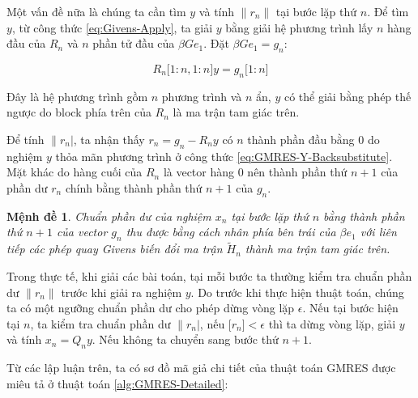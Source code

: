 \documentclass[14pt, a4paper]{article}
\numberwithin{equation}{section}
\numberwithin{algorithm}{section}
\numberwithin{figure}{section}
\newtheorem{md}{Mệnh đề}
\numberwithin{dl}{section}
\numberwithin{md}{section}
\numberwithin{bd}{section}
\numberwithin{dn}{section}
\begin{document}
Một vấn đề nữa là chúng ta cần tìm $y$ và tính $\lVert r_n \rVert$ tại bước lặp thứ $n$.
Để tìm $y$, từ công thức \ref{eq:Givens-Apply}, ta giải $y$ bằng giải hệ phương trình lấy $n$ hàng đầu của $R_n$ và $n$ phần tử đầu của $\beta G e_1$. Đặt $\beta G e_1 = g_n$:

\begin{equation} \label{eq:GMRES-Y-Backsubstitute}
    R_n \lbrack 1:n,1:n \rbrack y = g_n \lbrack 1:n \rbrack
\end{equation}

Đây là hệ phương trình gồm $n$ phương trình và $n$ ẩn, $y$ có thể giải bằng phép thế ngược do block phía trên của $R_n$ là ma trận tam giác trên.

Để tính $\lVert r_n \rvert$, ta nhận thấy $r_n=g_n - R_n y$ có $n$ thành phần đầu bằng 0 do nghiệm $y$ thỏa mãn phương trình ở công thức \ref{eq:GMRES-Y-Backsubstitute}. Mặt khác do hàng cuối của $R_n$ là vector hàng 0 nên thành phần thứ $n+1$ của phần dư $r_n$ chính bằng thành phần thứ $n+1$ của $g_n$.

\begin{md}
    Chuẩn phần dư của nghiệm $x_n$ tại bước lặp thứ $n$ bằng thành phần thứ $n+1$ của vector $g_n$ thu được bằng cách nhân phía bên trái của $\beta e_1$ với liên tiếp các phép quay Givens biến đổi ma trận $\widetilde{H}_n$ thành ma trận tam giác trên.
\end{md}

Trong thực tế, khi giải các bài toán, tại mỗi bước ta thường kiểm tra chuẩn phần dư $\lVert r_n \rVert$ trước khi giải ra nghiệm $y$. Do trước khi thực hiện thuật toán, chúng ta có một ngưỡng chuẩn phần dư cho phép dừng vòng lặp $\epsilon$. Nếu tại bước hiện tại $n$, ta kiểm tra chuẩn phần dư $\lVert r_n \rvert$, nếu $\lbrack r_n \rbrack < \epsilon$ thì ta dừng vòng lặp, giải $y$ và tính $x_n=Q_n y$. Nếu không ta chuyển sang bước thứ $n+1$.

Từ các lập luận trên, ta có sơ đồ mã giả chi tiết của thuật toán GMRES được miêu tả ở thuật toán \ref{alg:GMRES-Detailed}:
\end{document}
